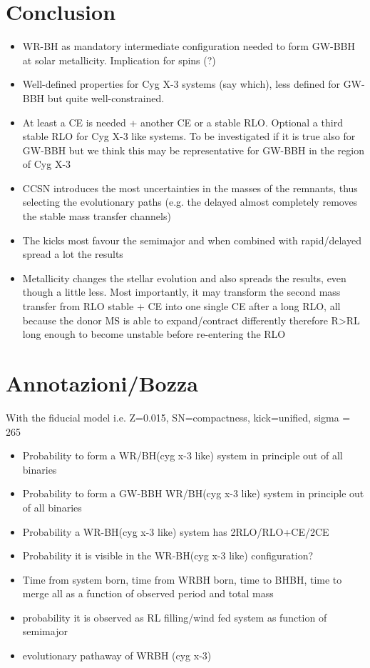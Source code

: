 \documentclass[a4paper,titlepage]{book}     	%
\begin{document}
\chapter{Conclusion}
\begin{itemize}
	\item WR-BH as mandatory intermediate configuration needed to form GW-BBH at solar metallicity. Implication for spins (?)
	\item Well-defined properties for Cyg X-3 systems (say which), less defined for GW-BBH but quite well-constrained.
	\item At least a CE is needed + another CE or a stable RLO. Optional a third stable RLO for Cyg X-3 like systems. To be investigated if it is true also for GW-BBH but we think this may be representative for GW-BBH in the region of Cyg X-3
	\item CCSN introduces the most uncertainties in the masses of the remnants, thus selecting the evolutionary paths (e.g. the delayed almost completely removes the stable mass transfer channels)
	\item The kicks most favour the semimajor and when combined with rapid/delayed spread a lot the results
	\item Metallicity changes the stellar evolution and also spreads the results, even though a little less. Most importantly, it may transform the second mass transfer from RLO stable + CE into one single CE after a long RLO, all because the donor MS is able to expand/contract differently therefore R>RL long enough to become unstable before re-entering the RLO
\end{itemize}






\chapter{Annotazioni/Bozza}
With the fiducial model i.e. Z=0.015, SN=compactness, kick=unified, sigma = 265
\begin{itemize}
	\item Probability to form a WR/BH(cyg x-3 like) system in principle out of all binaries
	\item Probability to form a GW-BBH WR/BH(cyg x-3 like) system in principle out of all binaries
	\item Probability a WR-BH(cyg x-3 like) system has 2RLO/RLO+CE/2CE
	\item Probability it is visible in the WR-BH(cyg x-3 like) configuration?
	\item Time from system born, time from WRBH born, time to BHBH, time to merge all as a function of observed period and total mass
	\item probability it is observed as RL filling/wind fed system as function of semimajor
	\item evolutionary pathaway of WRBH (cyg x-3)
\end{itemize}
\end{document}
